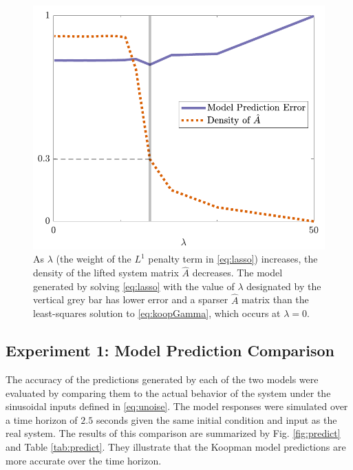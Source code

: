 \begin{figure}
    \centering
    \includegraphics[width=\linewidth]{figures/lasso_v2.pdf}
    \caption{As $\lambda$ (the weight of the $L^1$ penalty term in \eqref{eq:lasso}) increases, the density of the lifted system matrix $\hat{A}$ decreases.
    The model generated by solving \eqref{eq:lasso} with the value of $\lambda$ designated by the vertical grey bar has lower error and a sparser $\hat{A}$ matrix than the least-squares solution to \eqref{eq:koopGamma}, which occurs at $\lambda = 0$.}
    \label{fig:lasso}
\end{figure}



\subsection{Experiment 1: Model Prediction Comparison}
\label{sec:predict}

The accuracy of the predictions generated by each of the two models were evaluated by comparing them to the actual behavior of the system under the sinusoidal inputs defined in \eqref{eq:unoise}.
The model responses were simulated over a time horizon of $2.5$ seconds given the same initial condition and input as the real system.
The results of this comparison are summarized by Fig. \ref{fig:predict} and Table \ref{tab:predict}. 
They illustrate that the Koopman model predictions are more accurate over the time horizon.

